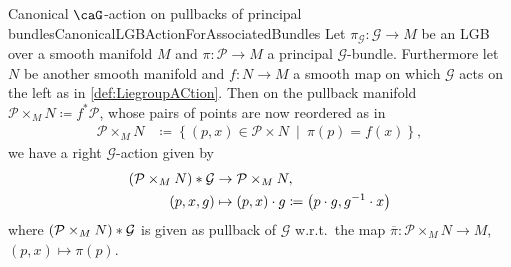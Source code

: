 \documentclass[reqno,a4paper,oneside]{amsart}
\theoremstyle{plain}
\theoremstyle{remark}
\theoremstyle{definition}
\begin{document}
\begin{propositions}{Canonical $\caG$-action on pullbacks of principal bundles}{CanonicalLGBActionForAssociatedBundles}
Let $\pi_{\mathcal{G}}\colon \mathcal{G} \to M$ be an LGB over a smooth manifold $M$ and $\pi\colon\mathcal{P} \to M$ a principal $\mathcal{G}$-bundle. Furthermore let $N$ be another smooth manifold and $f\colon N \to M$ a smooth map on which $\mathcal{G}$ acts on the left as in \ref{def:LiegroupACtion}. Then on the pullback manifold $\mathcal{P} \times_M N \coloneqq f^*\mathcal{P}$, whose pairs of points are now reordered as in
\begin{align*}
\mathcal{P} \times_M N
&\coloneqq
\left\{
	(p, x) \in \mathcal{P} \times N
	~\middle|~
	\pi(p) = f(x)
\right\},
\end{align*}
we have a right $\mathcal{G}$-action given by
\begin{align*}
\mleft(\mathcal{P} \times_M N\mright) * \mathcal{G} &\to \mathcal{P} \times_M N,\\
(p, x, g) &\mapsto (p, x) \cdot g \coloneqq \mleft( p \cdot g, g^{-1} \cdot x \mright)
\end{align*}
where $\mleft(\mathcal{P} \times_M N\mright) * \mathcal{G}$ is given as pullback of $\mathcal{G}$ w.r.t.\ the map $\overline{\pi}: \mathcal{P} \times_M N \to M$, $(p,x) \mapsto \pi(p)$.
\end{propositions}
\end{document}

